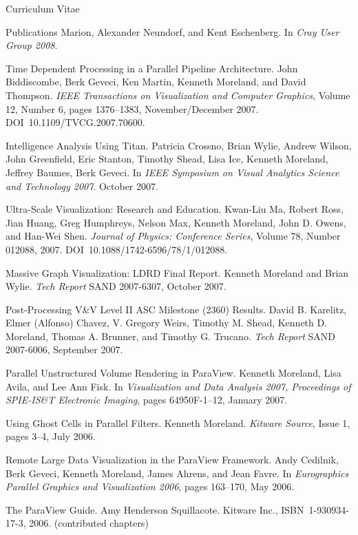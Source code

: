 \documentclass{article}
\begin{document}
\begin{cv}{Curriculum Vitae}
\begin{cvlist}{Publications}
      Marion, Alexander Neundorf, and Kent Eschenberg. In \emph{Cray User
        Group 2008}.
    \item[Time Dependent Processing in a Parallel Pipeline Architecture.]
      John Biddiscombe, Berk Geveci, Ken Martin, Kenneth Moreland, and
      David Thompson.  \emph{IEEE Transactions on Visualization and
        Computer Graphics}, Volume 12, Number 6, pages 1376--1383,
      November/December 2007.  DOI~10.1109/TVCG.2007.70600.
    \item[Intelligence Analysis Using Titan.] Patricia Crossno, Brian
      Wylie, Andrew Wilson, John Greenfield, Eric Stanton, Timothy Shead,
      Lisa Ice, Kenneth Moreland, Jeffrey Baumes, Berk Geveci. In
      \emph{IEEE Symposium on Visual Analytics Science and Technology
        2007}. October 2007.
    \item[Ultra-Scale Visualization: Research and Education.] Kwan-Liu Ma,
      Robert Ross, Jian Huang, Greg Humphreys, Nelson Max, Kenneth
      Moreland, John D. Owens, and Han-Wei Shen. \emph{Journal of Physics:
        Conference Series}, Volume 78, Number 012088,
      2007. DOI~10.1088/1742-6596/78/1/012088.
    \item[Massive Graph Visualization: LDRD Final Report.] Kenneth Moreland
      and Brian Wylie.  \emph{Tech Report} SAND 2007-6307, October 2007.
    \item[Post-Processing V\&V Level II ASC Milestone (2360) Results.]
      David B. Karelitz, Elmer (Alfonso) Chavez, V. Gregory Weirs, Timothy
      M. Shead, Kenneth D. Moreland, Thomas A. Brunner, and Timothy
      G. Trucano.  \emph{Tech Report} SAND 2007-6006, September 2007.
    \item[Parallel Unstructured Volume Rendering in ParaView.] Kenneth
      Moreland, Lisa Avila, and Lee Ann Fisk.  In \emph{Visualization and
        Data Analysis 2007, Proceedings of SPIE-IS\&T Electronic Imaging},
      pages 64950F-1--12, January 2007.
    \item[Using Ghost Cells in Parallel Filters.] Kenneth Moreland.
      \emph{Kitware Source}, Issue 1, pages 3--4, July 2006.
    \item[Remote Large Data Visualization in the ParaView Framework.] Andy
      Cedilnik, Berk Geveci, Kenneth Moreland, James Ahrens, and Jean
      Favre.  In \emph{Eurographics Parallel Graphics and Visualization
        2006}, pages 163--170, May 2006.
    \item[The ParaView Guide.] Amy Henderson Squillacote.  Kitware
      Inc., ISBN~1-930934-17-3, 2006. (contributed chapters)

\end{cvlist}
\end{cv}
\end{document}
